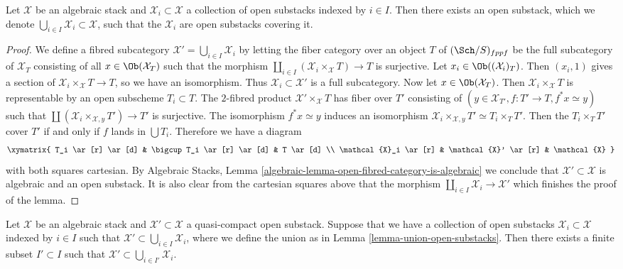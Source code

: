 \begin{lemma}
\label{lemma-union-open-substacks}
Let $\mathcal X$ be an algebraic stack and $\mathcal{X}_i \subset \mathcal X$
a collection of open substacks indexed by $i \in I$. Then there exists an
open substack, which we denote
$\bigcup_{i\in I} \mathcal{X}_i \subset \mathcal X$, such that
the $\mathcal{X}_i$ are open substacks covering it.
\end{lemma}

\begin{proof}
We define a fibred subcategory
$\mathcal{X}' = \bigcup_{i \in I} \mathcal{X}_i$
by letting the fiber category over an object $T$ of $(\Sch/S)_{fppf}$
be the full subcategory of $\mathcal{X}_T$ consisting of all
$x \in \Ob(\mathcal{X}_T)$ such that the morphism
$\coprod_{i \in I} (\mathcal{X}_i \times_{\mathcal X} T) \to T$
is surjective. Let $x_i \in \Ob((\mathcal{X}_i)_T)$.
Then $(x_i, 1)$ gives a section of
$\mathcal{X}_i \times_{\mathcal X} T \to T$, so we have an isomorphism. Thus
$\mathcal{X}_i \subset \mathcal{X}'$ is a full subcategory.
Now let $x \in \Ob(\mathcal{X}_T)$. Then
$\mathcal{X}_i \times_{\mathcal X} T$ is representable
by an open subscheme $T_i \subset T$. The $2$-fibred product
$\mathcal{X}' \times_{\mathcal X} T$ has fiber over $T'$ consisting
of $(y \in \mathcal{X}_{T'}, f : T' \to T, f^*x \simeq y)$ such that
$\coprod (\mathcal{X}_i \times_{\mathcal X, y} T') \to T'$ is surjective.
The isomorphism $f^*x \simeq y$ induces an isomorphism
$\mathcal{X}_i \times_{\mathcal X, y} T' \simeq T_i \times_T T'$.
Then the $T_i \times_T T'$ cover $T'$ if and only if $f$ lands in
$\bigcup T_i$. Therefore we have a diagram
$$
\xymatrix{
T_i \ar[r] \ar[d] &
\bigcup T_i \ar[r] \ar[d] &
T \ar[d] \\
\mathcal{X}_i \ar[r] &
\mathcal{X}' \ar[r] &
\mathcal{X}
}
$$
with both squares cartesian. By
Algebraic Stacks, Lemma \ref{algebraic-lemma-open-fibred-category-is-algebraic}
we conclude that $\mathcal{X'} \subset \mathcal{X}$ is algebraic and an
open substack. It is also clear from the cartesian squares above that the
morphism $\coprod_{i \in I} \mathcal{X}_i \to \mathcal{X}'$ which
finishes the proof of the lemma.
\end{proof}

\begin{lemma}
\label{lemma-quasi-compact-finite-subcover}
Let $\mathcal X$ be an algebraic stack and $\mathcal X' \subset \mathcal X$
a quasi-compact open substack. Suppose that we have a collection of open
substacks $\mathcal{X}_i \subset \mathcal X$  indexed by $i \in I$ such
that $\mathcal{X}' \subset \bigcup_{i \in I} \mathcal{X}_i$,
where we define the union as in Lemma \ref{lemma-union-open-substacks}.
Then there exists a finite subset $I' \subset I$ such that
$\mathcal{X}' \subset \bigcup_{i \in I'} \mathcal{X}_i$.
\end{lemma}

